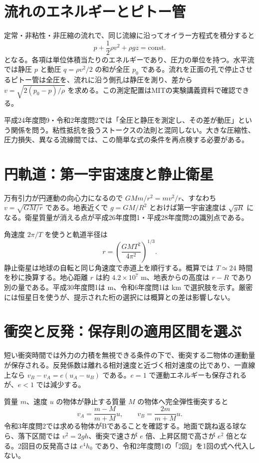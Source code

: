 \section{流れのエネルギーとピトー管}
\label{theory:mechanics:bernoulli}
定常・非粘性・非圧縮の流れで、同じ流線に沿ってオイラー方程式を積分すると
\[
 p+\frac12\rho v^2+\rho gz=\mathrm{const.}
\]
となる。各項は単位体積当たりのエネルギーであり、圧力の単位を持つ。水平流では静圧 $p$ と動圧 $q=\rho v^2/2$ の和が全圧 $p_0$ である。流れを正面の孔で停止させるピトー管は全圧を、流れに沿う側孔は静圧を測り、差から $v=\sqrt{2(p_0-p)/\rho}$ を求める。この測定配置はMITの実験講義資料で確認できる\cite{mit_pitot}。

平成24年度問9・令和2年度問2では「全圧と静圧を測定し、その差が動圧」という関係を問う。粘性抵抗を扱うストークスの法則と混同しない。大きな圧縮性、圧力損失、異なる流線間では、この簡単な式の条件を再点検する必要がある。

\section{円軌道：第一宇宙速度と静止衛星}
\label{theory:mechanics:orbit}
万有引力が円運動の向心力になるので $GMm/r^2=mv^2/r$、すなわち $v=\sqrt{GM/r}$ である。地表近くで $g=GM/R^2$ とおけば第一宇宙速度は $\sqrt{gR}$ になる。衛星質量が消える点が平成26年度問1・平成28年度問2の識別点である。

角速度 $2\pi/T$ を使うと軌道半径は
\[
 r=\left(\frac{GMT^2}{4\pi^2}\right)^{1/3}.
\]
静止衛星は地球の自転と同じ角速度で赤道上を順行する。概算では $T\simeq24$ 時間を秒に換算する。地心距離 $r$ は約 $4.2\times10^7$ m、地表からの高度は $r-R$ であり別の量である。平成30年度問1は m、令和6年度問1は km で選択肢を示す。厳密には恒星日を使うが、提示された桁の選択には概算との差は影響しない。

\section{衝突と反発：保存則の適用区間を選ぶ}
\label{theory:mechanics:impact}
短い衝突時間では外力の力積を無視できる条件の下で、衝突する二物体の運動量が保存される。反発係数は離れる相対速度と近づく相対速度の比であり、一直線上なら $v_B-v_A=e(u_A-u_B)$ である。$e=1$ で運動エネルギーも保存されるが、$e<1$ では減少する。

質量 $m$、速度 $u$ の物体が静止する質量 $M$ の物体へ完全弾性衝突すると
\[
 v_A=\frac{m-M}{m+M}u,\qquad v_B=\frac{2m}{m+M}u.
\]
令和3年度問2では求める物体がBであることを確認する。地面で跳ね返る球なら、落下区間では $v^2=2gh$、衝突で速さが $e$ 倍、上昇区間で高さが $e^2$ 倍となる。2回目の反発高さは $e^4h_0$ であり、令和2年度問1の「2回」を1回の式へ代入しない。


